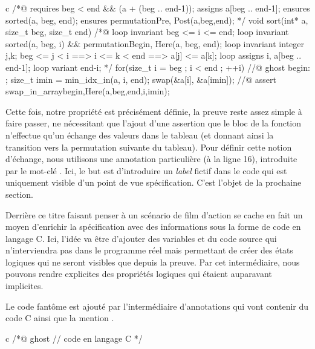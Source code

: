 \documentclass[middle]{zmdocument}
\begin{document}
\begin{CodeBlock}{c}
/*@
  requires beg < end && \valid(a + (beg .. end-1));
  assigns  a[beg .. end-1];  
  ensures sorted(a, beg, end);
  ensures permutation{Pre, Post}(a,beg,end);
*/
void sort(int* a, size_t beg, size_t end){
  /*@
    loop invariant beg <= i <= end;
    loop invariant sorted(a, beg, i) && permutation{Begin, Here}(a, beg, end);
    loop invariant \forall integer j,k; beg <= j < i ==> i <= k < end ==> a[j] <= a[k];
    loop assigns i, a[beg .. end-1];
    loop variant end-i;
  */
  for(size_t i = beg ; i < end ; ++i){
    //@ ghost begin: ;
    size_t imin = min_idx_in(a, i, end);
    swap(&a[i], &a[imin]);
    //@ assert swap_in_array{begin,Here}(a,beg,end,i,imin);
  }
}
\end{CodeBlock}



Cette fois, notre propriété est précisément définie, la preuve reste assez
simple à faire passer, ne nécessitant que l'ajout d'une assertion que le bloc
de la fonction n'effectue qu'un échange des valeurs dans le tableau (et donnant
ainsi la transition vers la permutation suivante du tableau). Pour définir cette
notion d'échange, nous utilisons une annotation particulière (à la ligne 16),
introduite par le mot-clé . Ici, le but est d'introduire un \textit{label} 
fictif dans le code qui est uniquement visible d'un point de vue spécification.
C'est l'objet de la prochaine section.





Derrière ce titre faisant penser à un scénario de film d'action se cache en fait
un moyen d'enrichir la spécification avec des informations sous la forme de code
en langage C. Ici, l'idée va être d'ajouter des variables et du code source qui
n'interviendra pas dans le programme réel mais permettant de créer des états 
logiques qui ne seront visibles que depuis la preuve. Par cet intermédiaire, 
nous pouvons rendre explicites des propriétés logiques qui étaient auparavant
implicites.





Le code fantôme est ajouté par l'intermédiaire d'annotations qui vont contenir 
du code C ainsi que la mention .



\begin{CodeBlock}{c}
/*@
  ghost
  // code en langage C
*/
\end{CodeBlock}
\end{document}

